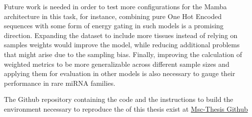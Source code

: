 \documentclass[en,ack]{dimscthesis}
\begin{document}
Future work is needed in order to test more configurations for the Mamba architecture in this task, for instance, combining pure One Hot Encoded sequences with some form of energy gating in such models is a promising direction. Expanding the dataset to include more tissues instead of relying on samples weights would improve the model, while reducing additional problems that might arise due to the sampling bias. Finally, improving the calculation of weighted metrics to be more generalizable across different sample sizes and applying them for evaluation in other models is also necessary to gauge their performance in rare miRNA families.

The Github repository containing the code and the instructions to build the environment necessary to reproduce the  of this thesis exist at \href{https://github.com/RafailTn/msc-thesis/tree/main}{Msc-Thesis Github}

\printbibliography[title=REFERENCES]
\end{document}
